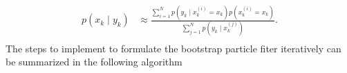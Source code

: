 \documentclass[nomenclature, english, bibtex]{kththesis}
\begin{document}
\begin{equation} \label{eq:markov}
    \begin{aligned}
        p(x_k \mid y_k) &\approx  \frac{\sum_{i=1}^{N}p(y_k \mid x_k^{(i)} = x_k) p(x_k^{(i)} = x_k)}{\sum_{j=1}^{N} p(y_k \mid x_k^{(j)})}. \\
    \end{aligned}
\end{equation}
% 
The steps to implement to formulate the bootstrap particle fiter iteratively can be summarized in the following algorithm \cite{sarkka_bayesian_nodate} \cite{liu_monte_2004} \cite{kuptametee_review_2022}
\end{document}
